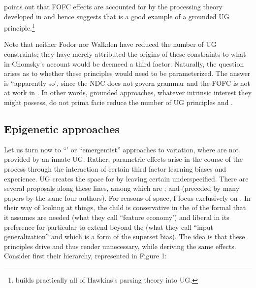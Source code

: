 \documentclass[output=paper,
modfonts
]{LSP/langsci}
\begin{document}
\citet{walkden2009} points out that FOFC effects are accounted for by the
processing theory developed in \citet{hawkins2004} and hence suggests that
 is a good example of a grounded UG principle.\footnote{\citet{mobbs2014}
  builds practically all of Hawkins's parsing theory into UG.}

Note that neither Fodor nor Walkden have reduced the number of UG
constraints; they have merely attributed the origins of these
constraints to what in Chomsky's account would be deemeed a third
factor. Naturally, the question arises as to whether these principles
would need to be parameterized. The answer is ``apparently so', since the
NDC does not govern  grammar \citep[75]{engdahl1985} and the FOFC is
not at work in  \citep{chan2013}. In other words, grounded approaches,
whatever intrinsic interest they might possess, do not prima facie
reduce the number of UG principles and .

\subsection{Epigenetic approaches}\label{sec:newmeyer:7.2}

Let us turn now to ``' or ``emergentist'' approaches to
variation, where  are not provided by an innate UG. Rather,
parametric effects arise in the course of the  process
through the interaction of certain third factor learning biases and
experience. UG creates the space for  by leaving
certain  underspecified. There are several proposals along these
lines, among which are 
\citet{gianollo2008,boeckx2011}; and \citet{biberauer2014}
(preceded by many papers by the same four authors).
For reasons of space, I focus exclusively on \citet{biberauer2014}. In their
way of looking at things, the child is conservative in the  of
the formal  that it assumes are needed (what they call ``feature
economy') and liberal in its preference for particular  to
extend beyond the  (what they call ``input generalization'' and which
is a form of the superset bias). The idea is that these principles drive
 and thus render  unnecessary, while deriving the
same effects. Consider first their  hierarchy, represented in
Figure 1:
\end{document}
